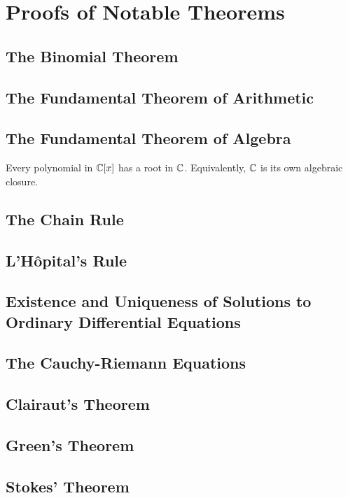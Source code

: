 \section{Proofs of Notable Theorems}

\subsection{The Binomial Theorem}

\subsection{The Fundamental Theorem of Arithmetic}

\subsection{The Fundamental Theorem of Algebra}

Every polynomial in $\mathbb{C}[x]$ has a root in $\mathbb{C}$. Equivalently, $\mathbb{C}$ is its own algebraic closure.

\subsection{The Chain Rule}

\subsection{L'Hôpital's Rule}

\subsection{Existence and Uniqueness of Solutions to Ordinary Differential Equations}

\subsection{The Cauchy-Riemann Equations}

\subsection{Clairaut's Theorem}

\subsection{Green's Theorem}

\subsection{Stokes' Theorem}

